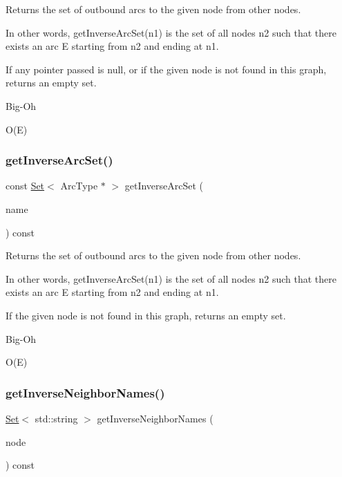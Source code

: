 Returns the set of outbound arcs to the given node from other nodes. 

In other words, get\+Inverse\+Arc\+Set(n1) is the set of all nodes n2 such that there exists an arc E starting from n2 and ending at n1.

If any pointer passed is null, or if the given node is not found in this graph, returns an empty set. \begin{DoxyRefDesc}{Big-\/\+Oh}
\item[\mbox{\hyperlink{BigOh__BigOh000065}{Big-\/\+Oh}}]O(\+E) \end{DoxyRefDesc}
\mbox{\label{classGraph_a2cfe12e71ca594736a1e329461cff024}} 
\subsubsection{\texorpdfstring{get\+Inverse\+Arc\+Set()}{getInverseArcSet()}\hspace{0.1cm}{\footnotesize\ttfamily [2/2]}}
{\footnotesize\ttfamily const \mbox{\hyperlink{classSet}{Set}}$<$ Arc\+Type $\ast$ $>$ get\+Inverse\+Arc\+Set (\begin{DoxyParamCaption}\item[{const std\+::string \&}]{name }\end{DoxyParamCaption}) const}



Returns the set of outbound arcs to the given node from other nodes. 

In other words, get\+Inverse\+Arc\+Set(n1) is the set of all nodes n2 such that there exists an arc E starting from n2 and ending at n1.

If the given node is not found in this graph, returns an empty set. \begin{DoxyRefDesc}{Big-\/\+Oh}
\item[\mbox{\hyperlink{BigOh__BigOh000066}{Big-\/\+Oh}}]O(\+E) \end{DoxyRefDesc}
\mbox{\label{classGraph_aa9eceee00e824ea4852449fa3de61e82}} 
\subsubsection{\texorpdfstring{get\+Inverse\+Neighbor\+Names()}{getInverseNeighborNames()}\hspace{0.1cm}{\footnotesize\ttfamily [1/2]}}
{\footnotesize\ttfamily \mbox{\hyperlink{classSet}{Set}}$<$ std\+::string $>$ get\+Inverse\+Neighbor\+Names (\begin{DoxyParamCaption}\item[{Node\+Type $\ast$}]{node }\end{DoxyParamCaption}) const}



